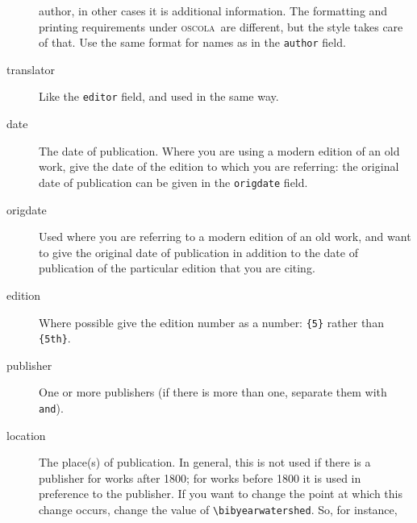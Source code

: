 \documentclass[a5paper,fontsize=9pt,DIV=1]{scrartcl}
\newcommand{\oscolashort}{\textsc{oscola}\nocite{oscola}}
\begin{document}
\begin{description}
  author, in other cases it is additional information. The formatting
  and printing requirements under \oscolashort\ are different, but the
  style takes care of that. Use the same format for names as in the
  \texttt{author} field.
\item[translator]
  Like the \texttt{editor} field, and used in the same
  way.
\item[date]
  The date of publication. Where you are using a modern edition of an old work, give the date of the edition to which you are referring: the original date of publication can be given in the \texttt{origdate} field.
\item[origdate]
  Used where you are referring to a modern edition of an
  old work, and want to give the original date of publication in
  addition to the date of publication of the particular edition that
  you are citing.
\item[edition]
  Where possible give the edition number as a number:
  \texttt{\{5\}} rather than \texttt{\{5th\}}.
\item[publisher]
  One or more publishers (if there is more than one,
  separate them with \texttt{and}).
\item[location]
  The place(s) of publication. In general, this is not
  used if there is a publisher for works after 1800; for works
  before 1800 it is used in preference to the publisher. If you want
  to change the point at which this change occurs, change the value of
  \verb|\bibyearwatershed|. So, for
  instance,
  \begin{verbatim}

\end{verbatim}
\end{description}
\end{document}
